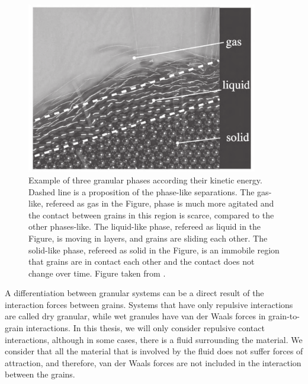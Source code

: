 \begin{figure}[H]
    \centering
    \includegraphics[width=0.9\textwidth]{04-figuras/Exemplo_Fases.png}
    \caption[Granular phases.]{Example of three granular phases according their kinetic energy. Dashed line is a proposition of the phase-like separations. The gas-like, refereed as gas in the Figure, phase is much more agitated and the contact between grains in this region is scarce, compared to the other phases-like. The liquid-like phase, refereed as liquid in the Figure, is moving in layers, and grains are sliding each other. The solid-like phase, refereed as solid in the Figure, is an immobile region that grains are in contact each other and the contact does not change over time. Figure taken from \cite{Granular_Media_Between_Fluid_and_Solid}.}
    \label{fig:exemplo_fases}
\end{figure}

    A differentiation between granular systems can be a direct result of the interaction forces between grains. Systems that have only repulsive interactions are called dry granular, while wet granules have van der Waals forces in grain-to-grain interactions. In this thesis, we will only consider repulsive contact interactions, although in some cases, there is a fluid surrounding the material. We consider that all the material that is involved by the fluid does not suffer forces of attraction, and therefore, van der Waals forces are not included in the interaction between the grains.

